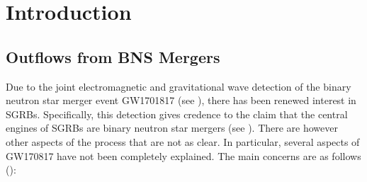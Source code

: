 \chapter{Introduction}\label{ch:introduction}

\section{Outflows from BNS Mergers}\label{sec:bns}
    Due to the joint electromagnetic and gravitational wave detection of the binary
    neutron star merger event GW1701817 (see \cite{abbott_2018}), there has
    been renewed interest in SGRBs.  Specifically, this detection gives credence to the
    claim that the central engines of SGRBs are binary neutron star mergers (see
    \cite{narayan_1992}). There are however other aspects of the process that are not as
    clear. In particular, several aspects of GW170817 have not been completely
    explained. The main concerns are as follows (\cite{lazzati_2020}):

